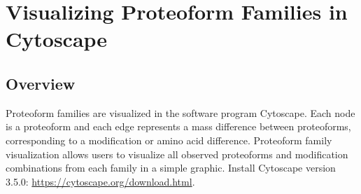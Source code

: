 
\section{Visualizing Proteoform Families in Cytoscape}

\subsection{Overview}
Proteoform families are visualized in the software program Cytoscape.\supercite{Shannon2003,Smoot2011} Each node is a proteoform and each edge represents a mass difference between proteoforms, corresponding to a modification or amino acid difference. Proteoform family visualization allows users to visualize all observed proteoforms and modification combinations from each family in a simple graphic. Install Cytoscape version 3.5.0: \url{https://cytoscape.org/download.html}.


